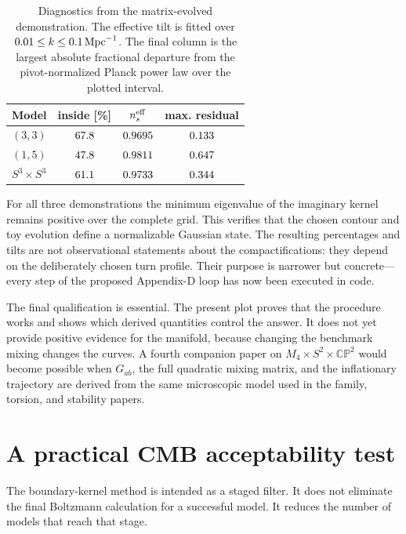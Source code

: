 \documentclass[aps,prd,twocolumn,superscriptaddress,nofootinbib,longbibliography,floatfix]{revtex4-2}
\newcommand{\CP}{\mathbb{CP}}
\begin{document}
\begin{table}[tbp]
\caption{Diagnostics from the matrix-evolved demonstration.  The effective tilt is fitted over $0.01\leq k\leq0.1\,{\rm Mpc}^{-1}$.  The final column is the largest absolute fractional departure from the pivot-normalized Planck power law over the plotted interval.}
\label{tab:matrixdiagnostics}
\begin{ruledtabular}
\begin{tabular}{lccc}
Model & inside [\%] & $n_s^{\rm eff}$ & max. residual\\
\hline
$(3,3)$ & $67.8$ & $0.9695$ & $0.133$\\
$(1,5)$ & $47.8$ & $0.9811$ & $0.647$\\
$S^3\times S^3$ & $61.1$ & $0.9733$ & $0.344$\\
\end{tabular}
\end{ruledtabular}
\end{table}

For all three demonstrations the minimum eigenvalue of the imaginary kernel remains positive over the complete grid.  This verifies that the chosen contour and toy evolution define a normalizable Gaussian state.  The resulting percentages and tilts are not observational statements about the compactifications: they depend on the deliberately chosen turn profile.  Their purpose is narrower but concrete---every step of the proposed Appendix-D loop has now been executed in code.

The final qualification is essential. The present plot proves that the procedure works and shows which derived quantities control the answer. It does not yet provide positive evidence for the manifold, because changing the benchmark mixing changes the curves. A fourth companion paper on $M_4\times S^2\times\CP^2$ would become possible when $G_{ab}$, the full quadratic mixing matrix, and the inflationary trajectory are derived from the same microscopic model used in the family, torsion, and stability papers.

\section{A practical CMB acceptability test}
\label{sec:acceptance}

The boundary-kernel method is intended as a staged filter. It does not eliminate the final Boltzmann calculation for a successful model. It reduces the number of models that reach that stage.
\end{document}
